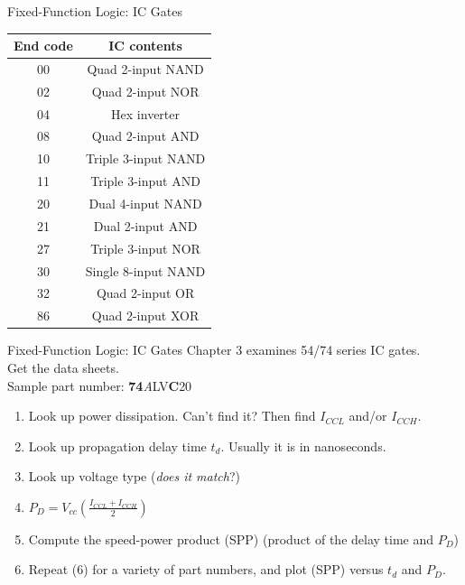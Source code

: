 \documentclass{beamer}
\begin{document}
\begin{frame}{Fixed-Function Logic: IC Gates}
\begin{table}
\begin{tabular}{c c}
\textbf{End code} & \textbf{IC contents} \\ \hline
00 & Quad 2-input NAND \\
02 & Quad 2-input NOR \\
04 & Hex inverter \\
08 & Quad 2-input AND \\
10 & Triple 3-input NAND \\
11 & Triple 3-input AND \\
20 & Dual 4-input NAND \\
21 & Dual 2-input AND \\
27 & Triple 3-input NOR \\
30 & Single 8-input NAND \\
32 & Quad 2-input OR \\
86 & Quad 2-input XOR
\end{tabular}
\end{table}
\end{frame}

\begin{frame}{Fixed-Function Logic: IC Gates}
\small
Chapter 3 examines 54/74 series IC gates. \\ \vspace{0.5cm}
 Get the data sheets. \\ \vspace{0.5cm}
Sample part number: \textbf{74}\textit{A}\alert{LV}\textbf{\alert{C}}20
\begin{enumerate}
\item Look up power dissipation.  Can't find it?  Then find $I_{CCL}$ and/or $I_{CCH}$.
\item Look up propagation delay time $t_d$.  Usually it is in nanoseconds.
\item Look up voltage type (\textit{does it match}?)
\item $P_D = V_{cc} \left(\frac{I_{CCL} + I_{CCH}}{2}\right)$
\item Compute the speed-power product (SPP) (product of the delay time and $P_D$)
\item Repeat (6) for a variety of part numbers, and plot (SPP) versus $t_d$ and $P_D$.
\end{enumerate}
\end{frame}
\end{document}
